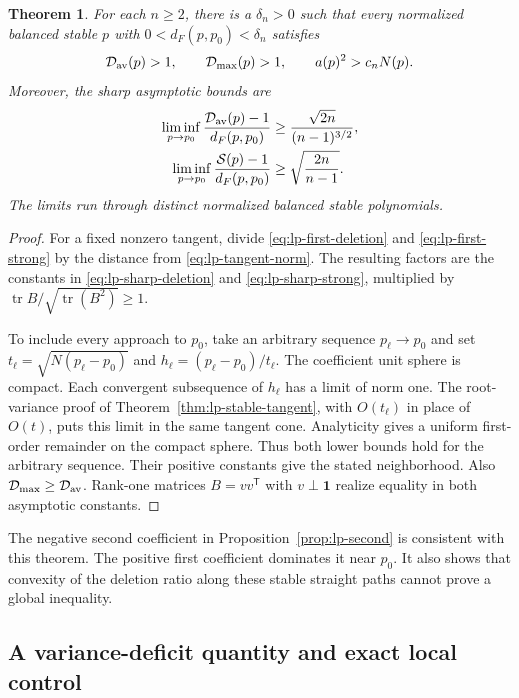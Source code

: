 \documentclass[11pt,a4paper]{article}
\newtheorem{theorem}{Theorem}[section]
\theoremstyle{definition}
\theoremstyle{remark}
\newcommand{\T}{\mathsf{T}}
\begin{document}
\begin{theorem}\label{thm:lp-stable-neighborhood}
For each $n\ge2$, there is a $\delta_n>0$ such that every normalized balanced stable $p$ with
$0<d_F(p,p_0)<\delta_n$ satisfies
\[
 \mathcal D_{\rm av}(p)>1,\qquad \mathcal D_{\max}(p)>1,\qquad
 a(p)^2>c_nN(p).
\]
Moreover, the sharp asymptotic bounds are
\begin{align}
 \liminf_{p\to p_0}\frac{\mathcal D_{\rm av}(p)-1}{d_F(p,p_0)}
 &\ge\frac{\sqrt{2n}}{(n-1)^{3/2}},\label{eq:lp-sharp-deletion}\\
 \liminf_{p\to p_0}\frac{\mathcal S(p)-1}{d_F(p,p_0)}
 &\ge\sqrt{\frac{2n}{n-1}}.\label{eq:lp-sharp-strong}
\end{align}
The limits run through distinct normalized balanced stable polynomials.
\end{theorem}
\begin{proof}
For a fixed nonzero tangent, divide \eqref{eq:lp-first-deletion} and \eqref{eq:lp-first-strong} by the distance from \eqref{eq:lp-tangent-norm}.
The resulting factors are the constants in \eqref{eq:lp-sharp-deletion} and \eqref{eq:lp-sharp-strong}, multiplied by
$\operatorname{tr}B/\sqrt{\operatorname{tr}(B^2)}\ge1$.

To include every approach to $p_0$, take an arbitrary sequence $p_\ell\to p_0$ and set
$t_\ell=\sqrt{N(p_\ell-p_0)}$ and $h_\ell=(p_\ell-p_0)/t_\ell$.
The coefficient unit sphere is compact.
Each convergent subsequence of $h_\ell$ has a limit of norm one.
The root-variance proof of Theorem~\ref{thm:lp-stable-tangent}, with $O(t_\ell)$ in place of $O(t)$, puts this limit in the same tangent cone.
Analyticity gives a uniform first-order remainder on the compact sphere.
Thus both lower bounds hold for the arbitrary sequence.
Their positive constants give the stated neighborhood.
Also $\mathcal D_{\max}\ge\mathcal D_{\rm av}$.
Rank-one matrices $B=vv^\T$ with $v\perp\mathbf1$ realize equality in both asymptotic constants.
\end{proof}

The negative second coefficient in Proposition~\ref{prop:lp-second} is consistent with this theorem.
The positive first coefficient dominates it near $p_0$.
It also shows that convexity of the deletion ratio along these stable straight paths cannot prove a global inequality.

\subsection{A variance-deficit quantity and exact local control}
\end{document}
